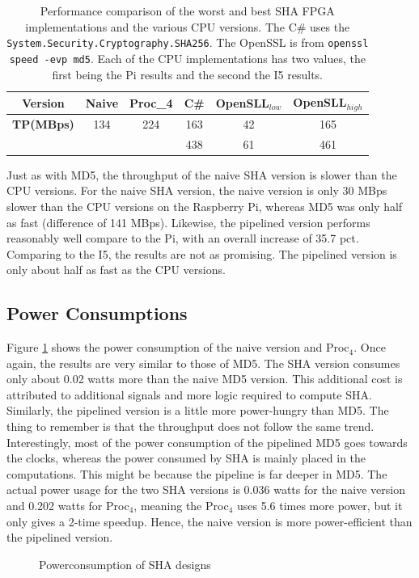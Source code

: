 \documentclass[a4paper, openany]{book}
\begin{document}
\begin{abstact}
\begin{table}[!htb]
\centering
\captionsetup{width=.8\linewidth}
\begin{tabular}{c c c c c c}
\hline
\textbf{Version} & Naive & Proc_{4} & C\# & OpenSLL$_{low}$ & OpenSLL$_{high}$\\
\hline
\textbf{TP(MBps)} & 134 & 224 & 163 & 42 & 165\\
 & & & 438 & 61 & 461
\end{tabular}
\caption[SHA256: FPGA and CPU comparisons]%
{Performance comparison of the worst and best SHA FPGA implementations and the various CPU versions. The C\# uses the \texttt{System.Security.Cryptography.SHA256}. The OpenSSL is from \texttt{openssl speed -evp md5}. Each of the CPU implementations has two values, the first being the Pi results and the second the I5 results.}
\label{tab:SHAcompare}
\end{table}
Just as with MD5, the throughput of the naive SHA version is slower than the CPU versions. For the naive SHA version, the naive version is only 30 MBps slower than the CPU versions on the Raspberry Pi, whereas MD5 was only half as fast (difference of 141 MBps). Likewise, the pipelined version performs reasonably well compare to the Pi, with an overall increase of 35.7 pct. Comparing to the I5, the results are not as promising. The pipelined version is only about half as fast as the CPU versions.
\subsection{Power Consumptions}
\label{sec:org931df34}
Figure \ref{fig:SHA_power} shows the power consumption of the naive version and Proc\(_4\). Once again, the results are very similar to those of MD5. The SHA version consumes only about 0.02 watts more than the naive MD5 version. This additional cost is attributed to additional signals and more logic required to compute SHA. Similarly, the pipelined version is a little more power-hungry than MD5. The thing to remember is that the throughput does not follow the same trend.
Interestingly, most of the power consumption of the pipelined MD5 goes towards the clocks, whereas the power consumed by SHA is mainly placed in the computations. This might be because the pipeline is far deeper in MD5. The actual power usage for the two SHA versions is 0.036 watts for the naive version and 0.202 watts for Proc\(_4\), meaning the Proc\(_4\) uses 5.6 times more power, but it only gives a 2-time speedup. Hence, the naive version is more power-efficient than the pipelined version.
\begin{figure}[H]
\centering
{}
\caption[Power consumption of SHA256 designs]
{Powerconsumption of SHA designs}
\label{fig:SHA_power}
\end{figure}

\end{abstact}
\end{document}
